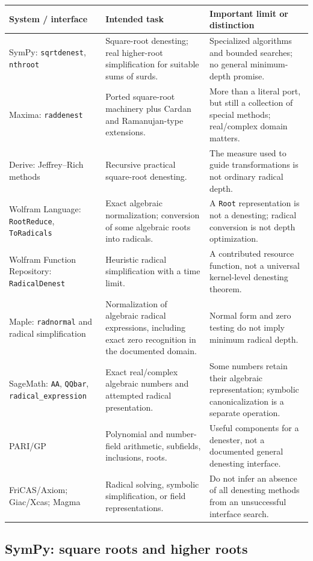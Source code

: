 \documentclass[11pt,a4paper]{article}
\theoremstyle{definition}
\theoremstyle{remark}
\numberwithin{equation}{section}
\begin{document}
\begin{longtable}{P{0.19\textwidth}P{0.35\textwidth}P{0.39\textwidth}}
\toprule
System / interface & Intended task & Important limit or distinction \\
\midrule\endhead
SymPy: \texttt{sqrtdenest}, \texttt{nthroot} & Square-root denesting; real higher-root simplification for suitable sums of surds. & Specialized algorithms and bounded searches; no general minimum-depth promise.\\
Maxima: \texttt{raddenest} & Ported square-root machinery plus Cardan and Ramanujan-type extensions. & More than a literal port, but still a collection of special methods; real/complex domain matters.\\
Derive: Jeffrey--Rich methods & Recursive practical square-root denesting. & The measure used to guide transformations is not ordinary radical depth.\\
Wolfram Language: \texttt{RootReduce}, \texttt{ToRadicals} & Exact algebraic normalization; conversion of some algebraic roots into radicals. & A \texttt{Root} representation is not a denesting; radical conversion is not depth optimization.\\
Wolfram Function Repository: \texttt{RadicalDenest} & Heuristic radical simplification with a time limit. & A contributed resource function, not a universal kernel-level denesting theorem.\\
Maple: \texttt{radnormal} and radical simplification & Normalization of algebraic radical expressions, including exact zero recognition in the documented domain. & Normal form and zero testing do not imply minimum radical depth.\\
SageMath: \texttt{AA}, \texttt{QQbar}, \texttt{radical\_}\allowbreak\texttt{expression} & Exact real/complex algebraic numbers and attempted radical presentation. & Some numbers retain their algebraic representation; symbolic canonicalization is a separate operation.\\
PARI/GP & Polynomial and number-field arithmetic, subfields, inclusions, roots. & Useful components for a denester, not a documented general denesting interface.\\
FriCAS/Axiom; Giac/Xcas; Magma & Radical solving, symbolic simplification, or field representations. & Do not infer an absence of all denesting methods from an unsuccessful interface search.\\
\bottomrule
\end{longtable}

\subsection{SymPy: square roots and higher roots}
\end{document}
